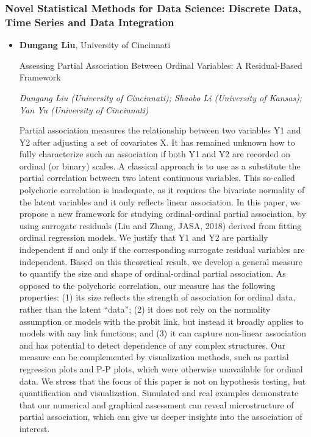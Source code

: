 \subsubsection*{Novel Statistical Methods for Data Science: Discrete Data, Time Series and Data Integration}

\begin{itemize}
\item \textbf{Dungang Liu}, University of Cincinnati

Assessing Partial Association Between Ordinal Variables: A Residual-Based Framework

\emph{\footnotesize Dungang Liu (University of Cincinnati); Shaobo Li (University of Kansas); Yan Yu (University of Cincinnati)}

Partial association measures the relationship between two variables Y1 and Y2 after adjusting a set of covariates X. It has remained unknown how to fully characterize such an association if both Y1 and Y2 are recorded on ordinal (or binary) scales. A classical approach is to use as a substitute the partial correlation between two latent continuous variables. This so-called polychoric correlation is inadequate, as it requires the bivariate normality of the latent variables and it only reflects linear association. In this paper, we propose a new framework for studying ordinal-ordinal partial association, by using surrogate residuals (Liu and Zhang, JASA, 2018) derived from fitting ordinal regression models. We justify that Y1 and Y2 are partially independent if and only if the corresponding surrogate residual variables are independent. Based on this theoretical result, we develop a general measure to quantify the size and shape of ordinal-ordinal partial association. As opposed to the polychoric correlation, our measure has the following properties: (1) its size reflects the strength of association for ordinal data, rather than the latent ``data''; (2) it does not rely on the normality assumption or models with the probit link, but instead it broadly applies to models with any link functions; and (3) it can capture non-linear association and has potential to detect dependence of any complex structures. Our measure can be complemented by visualization methods, such as partial regression plots and P-P plots, which were otherwise unavailable for ordinal data. We stress that the focus of this paper is not on hypothesis testing, but quantification and visualization. Simulated and real examples demonstrate that our numerical and graphical assessment can reveal microstructure of partial association, which can give us deeper insights into the association of interest.


\end{itemize}
